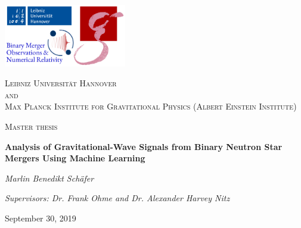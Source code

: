 \documentclass[11pt,a4paper]{article}
\numberwithin{equation}{section}
\theoremstyle{mystyle}
\numberwithin{thm}{subsection}
\begin{document}
\begin{titlepage}
\raggedbottom
\raggedright
\includegraphics[width=0.4\textwidth]{Logo.png}\par
\vspace{0.7cm}
\centering
{\scshape\LARGE Leibniz Universität Hannover\\and\\Max Planck Institute for Gravitational Physics (Albert Einstein Institute)\par}
\vspace{1cm}
{\scshape\Large Master thesis\par}
\vspace{1.2cm}
{\bfseries\huge Analysis of Gravitational-Wave Signals from Binary Neutron Star Mergers Using Machine Learning\par}
\vspace{2cm}
{\itshape\Large Marlin Benedikt Schäfer\par}
\vfill
{\itshape Supervisors: Dr. Frank Ohme and Dr. Alexander Harvey Nitz\par}
\vfill
{\large September 30, 2019\par}
\vfill
\end{titlepage}
\thispagestyle{empty}
\newpage

\setcounter{page}{2}
$\ $
\thispagestyle{empty}
\newpage
\end{document}
